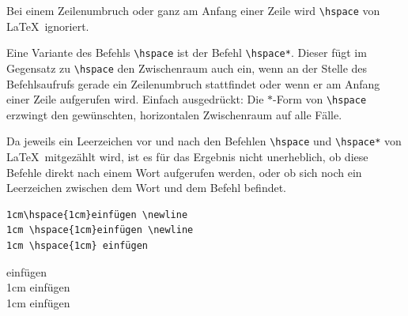 \documentclass[a4paper,10pt,twoside]{scrbook}
\begin{document}

Bei einem Zeilenumbruch oder 
ganz am Anfang einer Zeile wird 
\verb!\hspace! von \LaTeX\ ignoriert.

Eine Variante des Befehls \verb!\hspace! ist der Befehl 
\verb!\hspace*!. Dieser fügt im
Gegensatz zu \verb!\hspace! den Zwischenraum 
auch ein, wenn an der Stelle des
Befehlsaufrufs gerade ein Zeilenumbruch 
stattfindet oder wenn er am Anfang
einer Zeile aufgerufen wird. Einfach ausgedrückt: 
Die $\ast$-Form von 
\verb!\hspace! erzwingt den gewünschten, 
horizontalen Zwischenraum auf alle
Fälle. 


Da jeweils ein Leerzeichen vor und
nach den Befehlen \verb!\hspace! und \verb!\hspace*! von \LaTeX\ mitgezählt wird, ist es für das Ergebnis nicht unerheblich, ob diese Befehle direkt nach einem Wort aufgerufen werden, oder ob sich noch ein Leerzeichen zwischen dem Wort 
und dem Befehl befindet.





\begin{minipage}[c]{0.6\textwidth}
\setlength{\parskip}{1em}
\frenchspacing
\begin{Verbatim}[frame=single]
1cm\hspace{1cm}einfügen \newline
1cm \hspace{1cm}einfügen \newline
1cm \hspace{1cm} einfügen
\end{Verbatim}
\end{minipage}
\hfill
\begin{minipage}[c]{0.36\textwidth}
\setlength{\parskip}{1em}
\frenchspacing
1cm\hspace{1cm}einfügen \\
1cm \hspace{1cm}einfügen \\
1cm \hspace{1cm} einfügen
\end{minipage}
\end{document}
